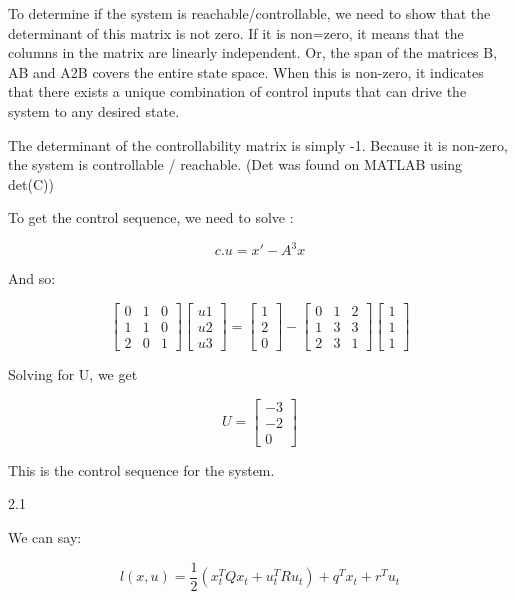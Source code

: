 \documentclass{article}
\begin{document}
 To determine if the system is reachable/controllable, we need to show that the determinant of this matrix is not zero. If it is non=zero, it means that the columns in the matrix are linearly independent. Or, the span of the matrices B, AB and A2B covers the entire state space. When this is non-zero, it indicates that there exists a unique combination of control inputs that can drive the system to any desired state. 
 
 The determinant of the controllability matrix is simply -1. Because it is non-zero, the system is controllable / reachable.  (Det was found on MATLAB using det(C)) 
 
 To get the control sequence, we need to solve :
 
 \[ c . u = x' - A^3x \]
 
 And so:
 
 
 \[ \begin{bmatrix}
 0 & 1 & 0 \\
 1 & 1 & 0 \\
 2 & 0 & 1 \end{bmatrix} \begin{bmatrix}
 u1 \\
 u2 \\
 u3 \end{bmatrix} = \begin{bmatrix} 
 1 \\
 2 \\
 0 \end{bmatrix} - \begin{bmatrix} 
 0 & 1 & 2 \\
 1 & 3 & 3 \\
 2 & 3 & 1 
 \end{bmatrix} \begin{bmatrix} 
 1 \\
 1 \\
 1
 \end{bmatrix} \]
 
 
 Solving for U, we get
 
 \[ U  = \begin{bmatrix}
 -3 \\
 -2 \\
 0
 \end{bmatrix} \]
 
 This is the control sequence for the system.
  
  
  2.1 
  
  
We can say:

\[ l(x, u) = \frac{1}{2} (x_t^T Q x_t + u_t^T R u_t) + q^Tx_t + r^Tu_t \]
\end{document}
